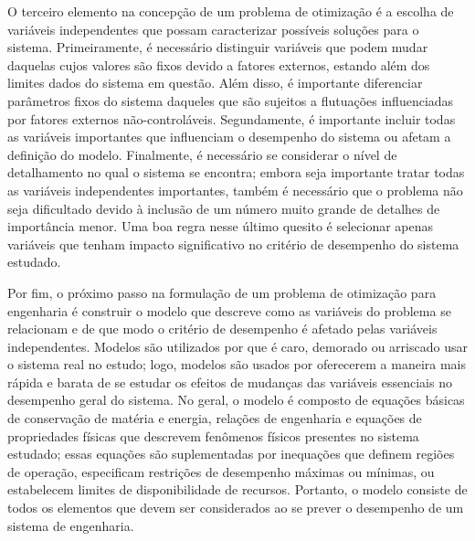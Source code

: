 O terceiro elemento na concep\c{c}\~{a}o de um problema de otimiza\c{c}\~{a}o \'{e} a escolha de vari\'{a}veis independentes que possam caracterizar poss\'{i}veis solu\c{c}\~{o}es para o sistema. Primeiramente, \'{e} necess\'{a}rio distinguir vari\'{a}veis que podem mudar daquelas cujos valores s\~{a}o fixos devido a fatores externos, estando al\'{e}m dos limites dados do sistema em quest\~{a}o. Al\'{e}m disso, \'{e} importante diferenciar par\^{a}metros fixos do sistema daqueles que s\~{a}o sujeitos a flutua\c{c}\~{o}es influenciadas por fatores externos n\~{a}o-control\'{a}veis. Segundamente, \'{e} importante incluir todas as vari\'{a}veis importantes que influenciam o desempenho do sistema ou afetam a defini\c{c}\~{a}o do modelo. Finalmente, \'{e} necess\'{a}rio se considerar o n\'{i}vel de detalhamento no qual o sistema se encontra; embora seja importante tratar todas as vari\'{a}veis independentes importantes, tamb\'{e}m \'{e} necess\'{a}rio que o problema n\~{a}o seja dificultado devido \`{a} inclus\~{a}o de um n\'{u}mero muito grande de detalhes de import\^{a}ncia menor. Uma boa regra nesse \'{u}ltimo quesito \'{e} selecionar apenas vari\'{a}veis que tenham impacto significativo no crit\'{e}rio de desempenho do sistema estudado.

Por fim, o pr\'{o}ximo passo na formula\c{c}\~{a}o de um problema de otimiza\c{c}\~{a}o para engenharia \'{e} construir o modelo que descreve como as vari\'{a}veis do problema se relacionam e de que modo o crit\'{e}rio de desempenho \'{e} afetado pelas vari\'{a}veis independentes. Modelos s\~{a}o utilizados por que \'{e} caro, demorado ou arriscado usar o sistema real no estudo; logo, modelos s\~{a}o usados por oferecerem a maneira mais r\'{a}pida e barata de se estudar os efeitos de mudan\c{c}as das vari\'{a}veis essenciais no desempenho geral do sistema. No geral, o modelo \'{e} composto de equa\c{c}\~{o}es b\'{a}sicas de conserva\c{c}\~{a}o de mat\'{e}ria e energia, rela\c{c}\~{o}es de engenharia e equa\c{c}\~{o}es de propriedades f\'{i}sicas que descrevem fen\^{o}menos f\'{i}sicos presentes no sistema estudado; essas equa\c{c}\~{o}es s\~{a}o suplementadas por inequa\c{c}\~{o}es que definem regi\~{o}es de opera\c{c}\~{a}o, especificam restri\c{c}\~{o}es de desempenho m\'{a}ximas ou m\'{i}nimas, ou estabelecem limites de disponibilidade de recursos. Portanto, o modelo consiste de todos os elementos que devem ser considerados ao se prever o desempenho de um sistema de engenharia.